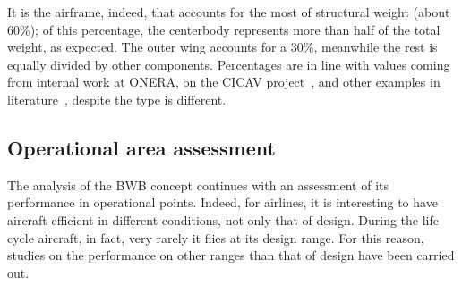 It is the airframe, indeed, that accounts for the most of structural weight (about 60\%); of this percentage, the centerbody represents more than half of the total weight, as expected. 
The outer wing accounts for a 30\%, meanwhile the rest is equally divided by other components. 
Percentages are in line with values coming from internal work at ONERA, on the CICAV project~\cite{bib:defoort}, and other examples in literature~\cite{bib:van_dommelen}, despite the type is different.

\subsection{Operational area assessment}
\label{subsec:chap4_bwb_mda_operational}

The analysis of the BWB concept continues with an assessment of its performance in operational points. 
Indeed, for airlines, it is interesting to have aircraft efficient in different conditions, not only that of design. 
During the life cycle aircraft, in fact, very rarely it flies at its design range. 
For this reason, studies on the performance on other ranges than that of design have been carried out. 

